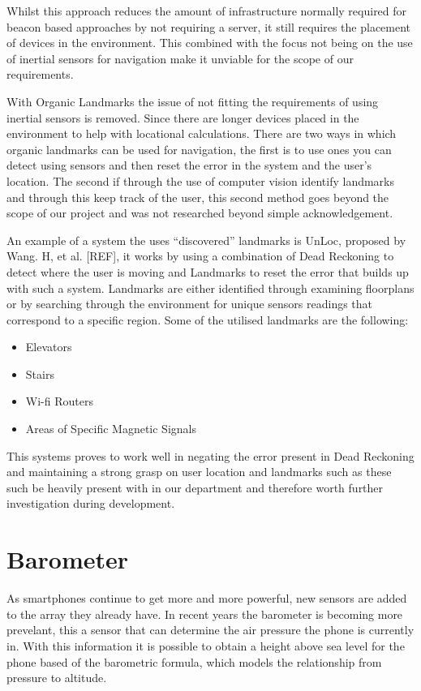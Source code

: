 \documentclass[main.tex]{subfiles}
\begin{document}
Whilst this approach reduces the amount of infrastructure normally required for beacon based approaches by not requiring a server, it still requires the placement of devices in the environment. This combined with the focus not being on the use of inertial sensors for navigation make it unviable for the scope of our requirements.

With Organic Landmarks the issue of not fitting the requirements of using inertial sensors is removed. Since there are longer devices placed in the environment to help with locational calculations. There are two ways in which organic landmarks can be used for navigation, the first is to use ones you can detect using sensors and then reset the error in the system and the user's location. The second if through the use of computer vision identify landmarks and through this keep track of the user, this second method goes beyond the scope of our project and was not researched beyond simple acknowledgement.

An example of a system the uses ``discovered'' landmarks is UnLoc, proposed by Wang. H, et al. [REF], it works by using a combination of Dead Reckoning to detect where the user is moving and Landmarks to reset the error that builds up with such a system. Landmarks are either identified through examining floorplans or by searching through the environment for unique sensors readings that correspond to a specific region. Some of the utilised landmarks are the following:

\begin{itemize}
	\item Elevators
	\item Stairs
	\item Wi-fi Routers
	\item Areas of Specific Magnetic Signals
\end{itemize}

This systems proves to work well in negating the error present in Dead Reckoning and maintaining a strong grasp on user location and landmarks such as these such be heavily present with in our department and therefore worth further investigation during development.

\section{Barometer}

As smartphones continue to get more and more powerful, new sensors are added to the array they already have. In recent years the barometer is becoming more prevelant, this a sensor that can determine the air pressure the phone is currently in. With this information it is possible to obtain a height above sea level for the phone based of the barometric formula, which models the relationship from pressure to altitude.
\end{document}

